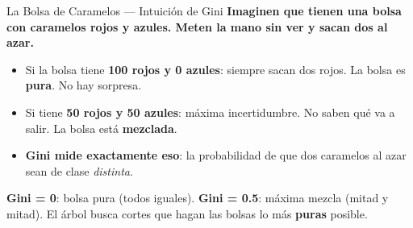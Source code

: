 \documentclass[aspectratio=169, 11pt]{beamer}
\begin{document}
\begin{frame}{La Bolsa de Caramelos --- Intuición de Gini}
  \vspace{-4pt}
  {\footnotesize\color{arcaDark}\bfseries
    Imaginen que tienen una bolsa con caramelos rojos y azules.
    Meten la mano \textbf{sin ver} y sacan dos al azar.}

  \vspace{6pt}
  {\footnotesize
  \begin{itemize}\setlength{\itemsep}{5pt}
    \item[{\color{codeGreen}\scriptsize\faArrowRight}]
      Si la bolsa tiene \textbf{100 rojos y 0 azules}: siempre sacan
      dos rojos. La bolsa es \textbf{pura}. No hay sorpresa.
    \item[{\color{codeOrange}\scriptsize\faArrowRight}]
      Si tiene \textbf{50 rojos y 50 azules}: máxima incertidumbre.
      No saben qué va a salir. La bolsa está \textbf{mezclada}.
    \item[{\color{arcaRed}\scriptsize\faArrowRight}]
      \textbf{Gini mide exactamente eso}: la probabilidad de que dos
      caramelos al azar sean de clase \textit{distinta}.
  \end{itemize}
  }

  \vspace{6pt}
  \begin{tcolorbox}[colback=arcaGray, colframe=arcaRed, boxrule=0.5pt, arc=2pt,
    left=6pt, right=6pt, top=4pt, bottom=4pt]
    {\scriptsize\color{arcaDark}
    \faKey\hspace{4pt}\textbf{Gini = 0}: bolsa pura (todos iguales).
    \textbf{Gini = 0.5}: máxima mezcla (mitad y mitad).
    El árbol busca cortes que hagan las bolsas lo más \textbf{puras} posible.}
  \end{tcolorbox}
\end{frame}
\end{document}
